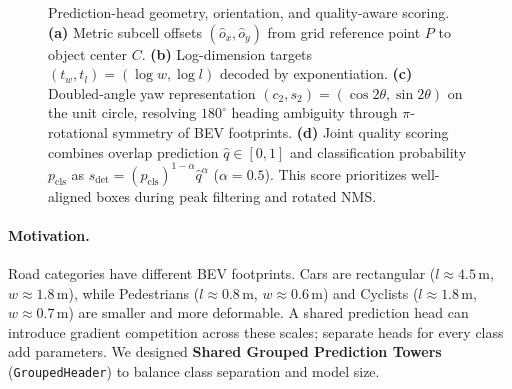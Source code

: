 \begin{figure}[t]
    \centering
    \caption{Prediction-head geometry, orientation, and quality-aware scoring. \textbf{(a)} Metric subcell offsets $(\hat{o}_x, \hat{o}_y)$ from grid reference point $P$ to object center $C$. \textbf{(b)} Log-dimension targets $(t_w, t_l) = (\log w, \log l)$ decoded by exponentiation. \textbf{(c)} Doubled-angle yaw representation $(c_2, s_2) = (\cos 2\theta, \sin 2\theta)$ on the unit circle, resolving $180^\circ$ heading ambiguity through $\pi$-rotational symmetry of BEV footprints. \textbf{(d)} Joint quality scoring combines overlap prediction $\hat{q} \in [0, 1]$ and classification probability $p_{\mathrm{cls}}$ as $s_{\mathrm{det}} = (p_{\mathrm{cls}})^{1-\alpha} \hat{q}^\alpha$ ($\alpha = 0.5$). This score prioritizes well-aligned boxes during peak filtering and rotated NMS.}
    \label{fig:geometry_output}
\end{figure}

\paragraph{Motivation.}
Road categories have different BEV footprints. Cars are rectangular ($l \approx 4.5$\,m, $w \approx 1.8$\,m), while Pedestrians ($l \approx 0.8$\,m, $w \approx 0.6$\,m) and Cyclists ($l \approx 1.8$\,m, $w \approx 0.7$\,m) are smaller and more deformable. A shared prediction head can introduce gradient competition across these scales; separate heads for every class add parameters. We designed \textbf{Shared Grouped Prediction Towers} (\texttt{GroupedHeader}) to balance class separation and model size.

